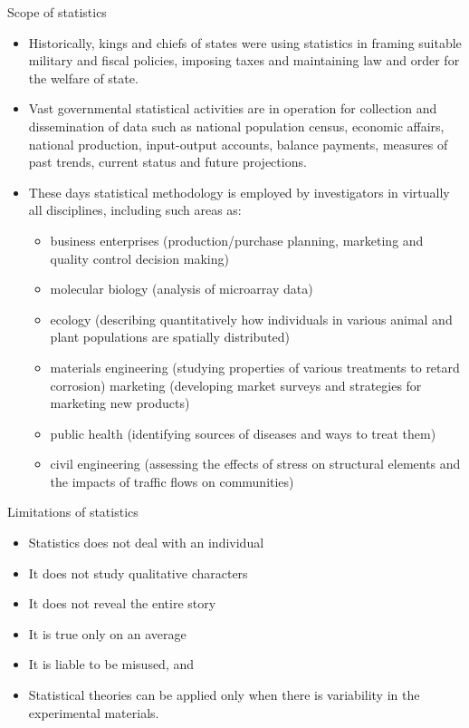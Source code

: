 \documentclass[
  ignorenonframetext,
  aspectratio=169]{beamer}
\providecommand{\tightlist}{%
  \setlength{\itemsep}{0pt}\setlength{\parskip}{0pt}}
\begin{document}
\begin{frame}{Scope of statistics}
\protect\hypertarget{scope-of-statistics}{}
\small

\begin{itemize}
\tightlist
\item
  Historically, kings and chiefs of states were using statistics in
  framing suitable military and fiscal policies, imposing taxes and
  maintaining law and order for the welfare of state.
\item
  Vast governmental statistical activities are in operation for
  collection and dissemination of data such as national population
  census, economic affairs, national production, input-output accounts,
  balance payments, measures of past trends, current status and future
  projections.
\item
  These days statistical methodology is employed by investigators in
  virtually all disciplines, including such areas as:

  \begin{itemize}
  \footnotesize
  \item business enterprises (production/purchase planning, marketing and quality control decision making)
  \item molecular biology (analysis of microarray data)
  \item ecology (describing quantitatively how individuals in various animal and plant populations are spatially distributed)
  \item materials engineering (studying properties of various treatments to retard corrosion) marketing (developing market surveys and strategies for marketing new products)
  \item public health (identifying sources of diseases and ways to treat them) 
  \item civil engineering (assessing the effects of stress on structural elements and the impacts of traffic flows on communities)
  \end{itemize}
\end{itemize}
\end{frame}

\begin{frame}{Limitations of statistics}
\protect\hypertarget{limitations-of-statistics}{}
\begin{itemize}
\tightlist
\item
  Statistics does not deal with an individual
\item
  It does not study qualitative characters
\item
  It does not reveal the entire story
\item
  It is true only on an average
\item
  It is liable to be misused, and
\item
  Statistical theories can be applied only when there is variability in
  the experimental materials.
\end{itemize}
\end{frame}
\end{document}
